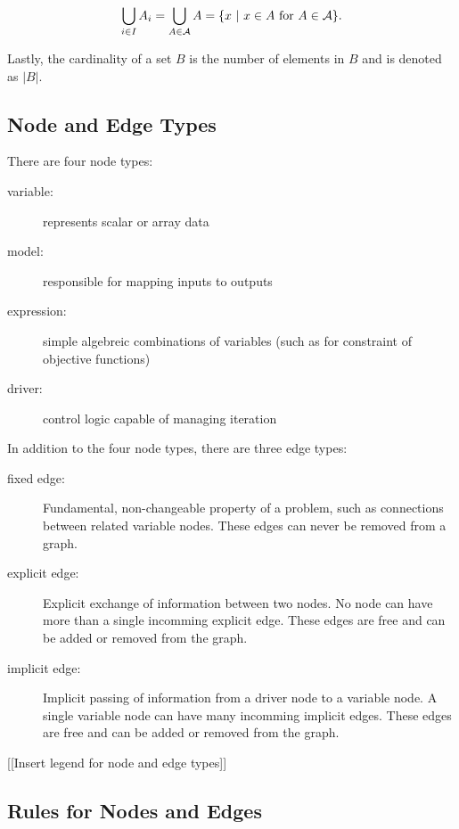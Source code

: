 \begin{equation}
\bigcup_{i \in I} A_i = \bigcup_{A \in \mathcal A} A = \{x \ | \  x \in A \textrm{ for } A \in \mathcal A\}.
\end{equation}

Lastly, the cardinality of a set $B$ is the number of elements in $B$ and is denoted as $|B|$.


\subsection{Node and Edge Types}

There are four node types:  
\begin{description}
\item[variable: ] represents scalar or array data
\item[model:] responsible for mapping inputs to outputs
\item[expression:] simple algebreic combinations of variables (such as for 
  constraint of objective functions)
\item[driver:] control logic capable of managing iteration
\end{description}

In addition to the four node types, there are three edge types: 

\begin{description}
\item[fixed edge:] Fundamental, non-changeable property of a problem, such as 
  connections between related variable nodes. These 
edges can never be removed from a graph. 
\item[explicit edge:] Explicit exchange of information between two nodes. No node 
  can have more than a single incomming explicit edge. These edges are free and
  can be added or removed from the graph. 
\item [implicit edge:] Implicit passing of information from a driver node to a 
  variable node. A single variable node can have many incomming implicit edges. These edges are 
  free and can be added or removed from the graph. 
\end{description}

[[Insert legend for node and edge types]]

\subsection{Rules for Nodes and Edges}

